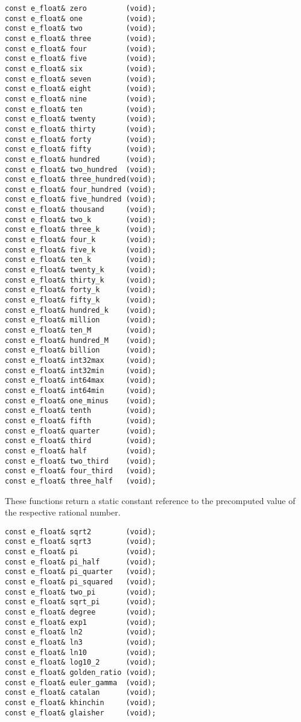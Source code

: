 \begin{lstlisting}
const e_float& zero         (void);
const e_float& one          (void);
const e_float& two          (void);
const e_float& three        (void);
const e_float& four         (void);
const e_float& five         (void);
const e_float& six          (void);
const e_float& seven        (void);
const e_float& eight        (void);
const e_float& nine         (void);
const e_float& ten          (void);
const e_float& twenty       (void);
const e_float& thirty       (void);
const e_float& forty        (void);
const e_float& fifty        (void);
const e_float& hundred      (void);
const e_float& two_hundred  (void);
const e_float& three_hundred(void);
const e_float& four_hundred (void);
const e_float& five_hundred (void);
const e_float& thousand     (void);
const e_float& two_k        (void);
const e_float& three_k      (void);
const e_float& four_k       (void);
const e_float& five_k       (void);
const e_float& ten_k        (void);
const e_float& twenty_k     (void);
const e_float& thirty_k     (void);
const e_float& forty_k      (void);
const e_float& fifty_k      (void);
const e_float& hundred_k    (void);
const e_float& million      (void);
const e_float& ten_M        (void);
const e_float& hundred_M    (void);
const e_float& billion      (void);
const e_float& int32max     (void);
const e_float& int32min     (void);
const e_float& int64max     (void);
const e_float& int64min     (void);
const e_float& one_minus    (void);
const e_float& tenth        (void);
const e_float& fifth        (void);
const e_float& quarter      (void);
const e_float& third        (void);
const e_float& half         (void);
const e_float& two_third    (void);
const e_float& four_third   (void);
const e_float& three_half   (void);
\end{lstlisting}

\vspace{6.0pt}

 These functions return a static constant
reference to the precomputed value of the respective rational number.

\begin{lstlisting}
const e_float& sqrt2        (void);
const e_float& sqrt3        (void);
const e_float& pi           (void);
const e_float& pi_half      (void);
const e_float& pi_quarter   (void);
const e_float& pi_squared   (void);
const e_float& two_pi       (void);
const e_float& sqrt_pi      (void);
const e_float& degree       (void);
const e_float& exp1         (void);
const e_float& ln2          (void);
const e_float& ln3          (void);
const e_float& ln10         (void);
const e_float& log10_2      (void);
const e_float& golden_ratio (void);
const e_float& euler_gamma  (void);
const e_float& catalan      (void);
const e_float& khinchin     (void);
const e_float& glaisher     (void);
\end{lstlisting}

